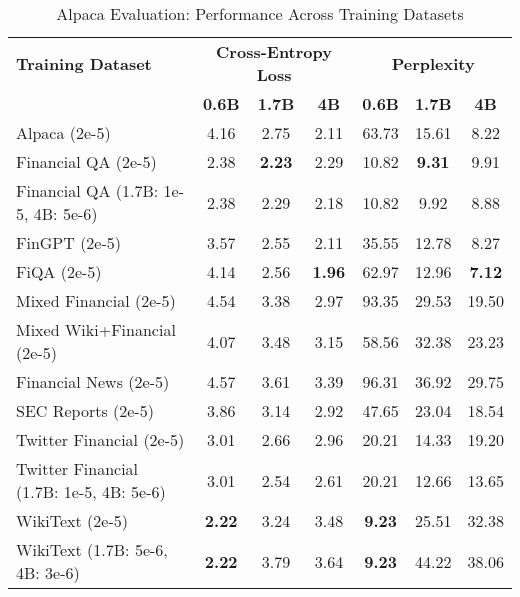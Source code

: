 
\begin{table}[htbp]
\centering
\caption[Alpaca Evaluation: Cross-Dataset Performance]{Alpaca Evaluation: Performance Across Training Datasets}
\label{tab:cross_alpaca}
\begin{tabular}{l|ccc|ccc}
\hline
\textbf{Training Dataset} & \multicolumn{3}{c|}{\textbf{Cross-Entropy Loss}} & \multicolumn{3}{c}{\textbf{Perplexity}} \\
\cline{2-4} \cline{5-7}
  & \textbf{0.6B} & \textbf{1.7B} & \textbf{4B} & \textbf{0.6B} & \textbf{1.7B} & \textbf{4B} \\
Alpaca (2e-5) & 4.16 & 2.75 & 2.11 & 63.73 & 15.61 & 8.22  \\
Financial QA (2e-5) & 2.38 & \textbf{2.23} & 2.29 & 10.82 & \textbf{9.31} & 9.91  \\
Financial QA (1.7B: 1e-5, 4B: 5e-6) & 2.38 & 2.29 & 2.18 & 10.82 & 9.92 & 8.88  \\
FinGPT (2e-5) & 3.57 & 2.55 & 2.11 & 35.55 & 12.78 & 8.27  \\
FiQA (2e-5) & 4.14 & 2.56 & \textbf{1.96} & 62.97 & 12.96 & \textbf{7.12}  \\
Mixed Financial (2e-5) & 4.54 & 3.38 & 2.97 & 93.35 & 29.53 & 19.50  \\
Mixed Wiki+Financial (2e-5) & 4.07 & 3.48 & 3.15 & 58.56 & 32.38 & 23.23  \\
Financial News (2e-5) & 4.57 & 3.61 & 3.39 & 96.31 & 36.92 & 29.75  \\
SEC Reports (2e-5) & 3.86 & 3.14 & 2.92 & 47.65 & 23.04 & 18.54  \\
Twitter Financial (2e-5) & 3.01 & 2.66 & 2.96 & 20.21 & 14.33 & 19.20  \\
Twitter Financial (1.7B: 1e-5, 4B: 5e-6) & 3.01 & 2.54 & 2.61 & 20.21 & 12.66 & 13.65  \\
WikiText (2e-5) & \textbf{2.22} & 3.24 & 3.48 & \textbf{9.23} & 25.51 & 32.38  \\
WikiText (1.7B: 5e-6, 4B: 3e-6) & \textbf{2.22} & 3.79 & 3.64 & \textbf{9.23} & 44.22 & 38.06  \\
\hline
\end{tabular}
\end{table}

